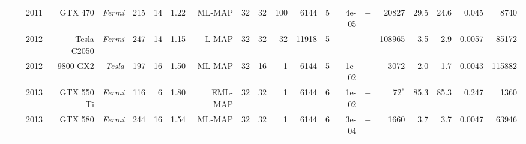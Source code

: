 \begin{table}
\begin{adjustbox}{angle=90}
{{\begin{tabular}{|r|r|r||r|r|r|r|r|r|r|r|r|r|r||r|r|r|r||r|r|r|}
                                                                 & \cite{Wu2011}                   & 2011                  & GTX 470                  & \textit{Fermi}                   & 215                  & 14                 & 1.22                   &  ML-MAP                  & 32                  & 32                  & 100                 & 6144                  & 5                  & 4e-05                         & \multicolumn{1}{c|}{$-$} &  20827        &   29.5           &  24.6          & 0.045         &   8740             \\ \cline{2-21}
                                                                 & \cite{Chinnici2012}             & 2012                  & Tesla C2050              & \textit{Fermi}                   & 247                  & 14                 & 1.15                   &   L-MAP                  & 32                  & 32                  & 32                  & 11918                 & 5                  & \multicolumn{1}{c|}{$-$}      & \multicolumn{1}{c|}{$-$} & 108965        &    3.5           &   2.9          & 0.0057        &  85172             \\ \cline{2-21}
                                                                 & \cite{Yoge2012}                 & 2012                  & 9800 GX2                 & \textit{Tesla}                   & 197                  & 16                 & 1.50                   &  ML-MAP                  & 32                  & 16                  & 1                   & 6144                  & 5                  & 1e-02                         & \multicolumn{1}{c|}{$-$} &   3072        &    2.0           &   1.7          & 0.0043        & 115882             \\ \cline{2-21}
                                                                 & \cite{Liu2013}                  & 2013                  & GTX 550 Ti               & \textit{Fermi}                   & 116                  & 6                  & 1.80                   & EML-MAP                  & 32                  & 32                  & 1                   & 6144                  & 6                  & 1e-02                         & \multicolumn{1}{c|}{$-$} &     72$^*$    &   85.3           &  85.3          & 0.247         &   1360             \\ \cline{2-21}
                                                                 & \cite{Chen2013}                 & 2013                  & GTX 580                  & \textit{Fermi}                   & 244                  & 16                 & 1.54                   &  ML-MAP                  & 32                  & 32                  & 1                   & 6144                  & 6                  & 3e-04                         & \multicolumn{1}{c|}{$-$} &   1660        &    3.7           &   3.7          & 0.0047        &  63946             \\ \cline{2-21}

\end{tabular}}}
\end{adjustbox}
\end{table}
